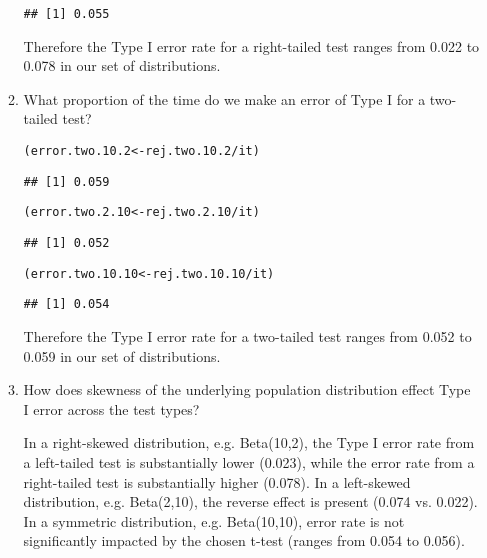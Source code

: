 \documentclass{article}\usepackage[]{graphicx}\usepackage[]{xcolor}
\makeatletter
\newcommand{\hlopt}[1]{\textcolor[rgb]{0,0,0}{#1}}%
\newcommand{\hldef}[1]{\textcolor[rgb]{0.345,0.345,0.345}{#1}}%
\newcommand{\hlkwb}[1]{\textcolor[rgb]{0.69,0.353,0.396}{#1}}%
\newenvironment{kframe}{%
 \def\at@end@of@kframe{}%
 \ifinner\ifhmode%
  \def\at@end@of@kframe{\end{minipage}}%
  \begin{minipage}{\columnwidth}%
 \fi\fi%
 \def\FrameCommand##1{\hskip\@totalleftmargin \hskip-\fboxsep
 \colorbox{shadecolor}{##1}\hskip-\fboxsep
     \hskip-\linewidth \hskip-\@totalleftmargin \hskip\columnwidth}%
 \MakeFramed {\advance\hsize-\width
   \@totalleftmargin\z@ \linewidth\hsize
   \@setminipage}}%
 {\par\unskip\endMakeFramed%
 \at@end@of@kframe}
\newenvironment{knitrout}{}{} %
\makeatother
\begin{document}
\begin{enumerate}
\begin{enumerate}
\begin{knitrout}
\begin{kframe}
\begin{verbatim}
## [1] 0.055
\end{verbatim}
\end{kframe}
\end{knitrout}
Therefore the Type I error rate for a right-tailed test ranges from 0.022 to 0.078 in our set of distributions.
    \item What proportion of the time do we make an error of Type I for a
    two-tailed test?
\begin{knitrout}\scriptsize
{}\color{fgcolor}\begin{kframe}
\begin{alltt}
\hldef{(error.two.10.2} \hlkwb{<-} \hldef{rej.two.10.2} \hlopt{/} \hldef{it)}
\end{alltt}
\begin{verbatim}
## [1] 0.059
\end{verbatim}
\begin{alltt}
\hldef{(error.two.2.10} \hlkwb{<-} \hldef{rej.two.2.10} \hlopt{/} \hldef{it)}
\end{alltt}
\begin{verbatim}
## [1] 0.052
\end{verbatim}
\begin{alltt}
\hldef{(error.two.10.10} \hlkwb{<-} \hldef{rej.two.10.10} \hlopt{/} \hldef{it)}
\end{alltt}
\begin{verbatim}
## [1] 0.054
\end{verbatim}
\end{kframe}
\end{knitrout}
Therefore the Type I error rate for a two-tailed test ranges from 0.052 to 0.059 in our set of distributions.
    \item How does skewness of the underlying population distribution effect
    Type I error across the test types?
    
In a right-skewed distribution, e.g. Beta(10,2), the Type I error rate from a left-tailed test is substantially lower (0.023), while the error rate from a right-tailed test is substantially higher (0.078). In a left-skewed distribution, e.g. Beta(2,10), the reverse effect is present (0.074 vs. 0.022). In a symmetric distribution, e.g. Beta(10,10), error rate is not significantly impacted by the chosen t-test (ranges from 0.054 to 0.056).
  \end{enumerate}
\end{enumerate}

\end{document}
